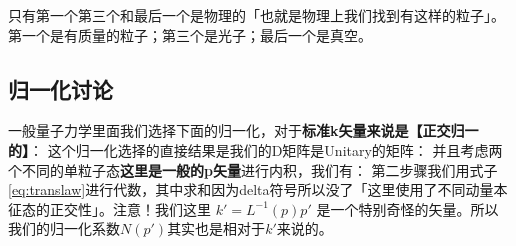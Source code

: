 只有第一个第三个和最后一个是物理的「也就是物理上我们找到有这样的粒子」。第一个是有质量的粒子；第三个是光子；最后一个是真空。

\subsection{归一化讨论}
\label{sec:normalization}

一般量子力学里面我们选择下面的归一化，对于\textbf{标准k矢量来说是【正交归一的】}：
这个归一化选择的直接结果是我们的D矩阵是Unitary的矩阵：
并且考虑两个不同的单粒子态\textbf{这里是一般的p矢量}进行内积，我们有：
第二步骤我们用式子\cref{eq:translaw}进行代数，其中求和因为delta符号所以没了「这里使用了不同动量本征态的正交性」。注意！我们这里 $ k' = L^{-1}(p)p' $ 是一个特别奇怪的矢量。所以我们的归一化系数$ N(p') $其实也是相对于$ k' $来说的。

